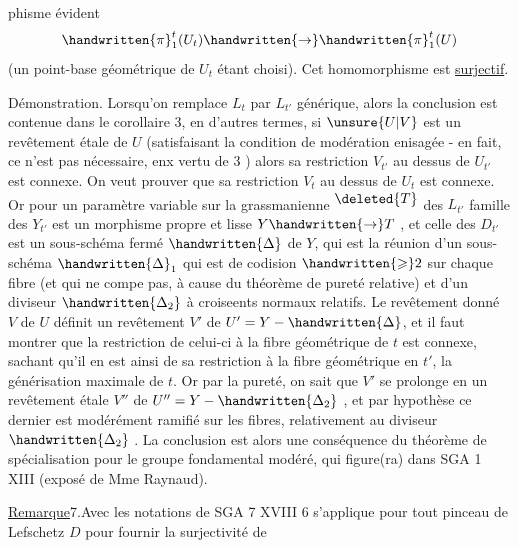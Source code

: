 %
phisme évident
\[
\handwritten{\pi}_1^t(U_t)\handwritten{\rightarrow}\handwritten{\pi}_1^t(U)
\]
(un point-base géométrique de $U_t$ étant choisi). Cet homomorphisme est \uline{surjectif}.

Démonstration. Lorsqu'on remplace $L_t$ par $L_{t'}$ générique, alors la conclusion est contenue dans le corollaire 3, en d'autres termes, si $\unsure{U|V}$ est un revêtement étale  de $U$  (satisfaisant la condition de modération enisagée - en fait, ce n'est pas nécessaire, enx vertu de 3 ) alors sa restriction $V_{t'}$ au dessus de $U_{t'}$ est connexe. On veut prouver que sa restriction $V_t$ au dessus de $U_t$ est  connexe. Or pour un paramètre variable sur  la grassmanienne \textsuperscript{$\deleted{T}$} des $L_{t'}$\handwritten{,}   famille des $Y_{t'}$ est un morphisme propre et lisse $Y\handwritten{\rightarrow}T$ , et celle des $D_{t'}$ est un sous-schéma fermé  $\handwritten{\Delta}$ de $Y$, qui est la réunion d'un sous-schéma $\handwritten{\Delta}_1$ qui est de codision $\handwritten{\geqslant}2$ sur chaque fibre (et qui ne compe pas, à cause du théorème de pureté relative) et d'un diviseur $\handwritten{\Delta_2}$ à croiseents normaux relatifs. Le revêtement donné $V$ de $U$ définit un revêtement  $V'$ de $U'=Y-\handwritten{\Delta}$, et il faut montrer que la restriction de celui-ci à la fibre géométrique de $t$ est connexe, sachant qu'il en est ainsi de sa restriction à la fibre géométrique en $t'$, la générisation maximale de $t$. Or par la pureté, on sait que $V'$ se prolonge en un revêtement étale $V''$ de $U''=Y-\handwritten{\Delta_2}$ , et par hypothèse ce dernier est modérément ramifié sur les fibres, relativement au diviseur $\handwritten{\Delta_2}$ . La conclusion est alors une conséquence du théorème  de spécialisation pour le groupe fondamental modéré, qui figure(ra) dans SGA 1 XIII (exposé de Mme Raynaud).

\uline{Remarque}7.Avec les notations de SGA 7 XVIII\handwritten{,} 6 s'applique pour tout pinceau de Lefschetz $D$ pour fournir la surjectivité de

